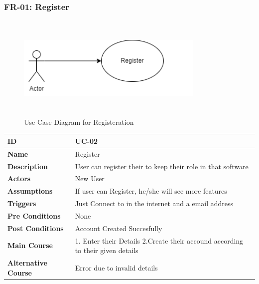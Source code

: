\setcounter{figure}{0}
\subsubsection{FR-01: Register}
    \begin{figure}[H]
    \includegraphics[height=5cm, width=0.8\textwidth]{./diagrams/Use Case/u1.png}
    \centering 
    \caption{Use Case Diagram for Registeration}
    \label{figure1}
    \end{figure}
    
    \begin{center}
        \begin{tabularx}{\textwidth}{|l|X|}
            \hline
            \textbf{ID} & UC-02 \\
            \hline
            \textbf{Name} & Register \\
            \hline
            \textbf{Description} & User can register their to keep their role in that software \\
            \hline
            \textbf{Actors} & New User \\
            \hline
            \textbf{Assumptions} & If user can Register, he/she will see more features \\
            \hline
            \textbf{Triggers} & Just Connect to in the internet and a email address \\
            \hline
            \textbf{Pre Conditions} & None \\
            \hline
            \textbf{Post Conditions} & Account Created Succesfully \\
            \hline
            \textbf{Main Course} & 1. Enter their Details 2.Create their accound according to their given details \\
            \hline
            \textbf{Alternative Course} & Error due to invalid details \\
            \hline
            
        \end{tabularx}
    \end{center}
    \newpage
    


